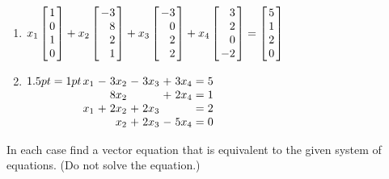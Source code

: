 \begin{multicols}{2}
\begin{ex}
\begin{enumerate}[leftmargin=1em,label={\alph*.}]
\item 
{\scriptsize $x_{1} \leftB \begin{array}{r}
1 \\
0 \\
1 \\
0
\end{array} \rightB + x_{2} \leftB \begin{array}{r}
-3 \\
8 \\
2 \\
1
\end{array} \rightB + x_{3} \leftB \begin{array}{r}
-3 \\
0 \\
2 \\
2
\end{array} \rightB + x_{4} \leftB \begin{array}{r}
3 \\
2 \\
0 \\
-2
\end{array} \rightB = \leftB \begin{array}{r}
5 \\
1 \\
2 \\
0
\end{array} \rightB$}


\end{enumerate}
\begin{sol}
\begin{enumerate}[label={\alph*.}]
\setcounter{enumi}{1}
\item  
$\arraycolsep=1pt
\begin{array}[t]{rrrrrrrrr}
x_{1} & - & 3x_{2} & - & 3x_{3} & + & 3x_{4} & = & 5 \\
 &  & 8x_{2} &  &  & + & 2x_{4} & = & 1 \\
x_{1} & + & 2x_{2} & + & 2x_{3} &  &  & = & 2 \\
&  & x_{2} & + & 2x_{3} & - & 5x_{4} & = & 0 \\
\end{array}$


\end{enumerate}
\end{sol}
\end{ex}

\begin{ex}
In each case find a vector equation that is equivalent to the given system of equations. (Do not solve the equation.)



\end{ex}
\end{multicols}
